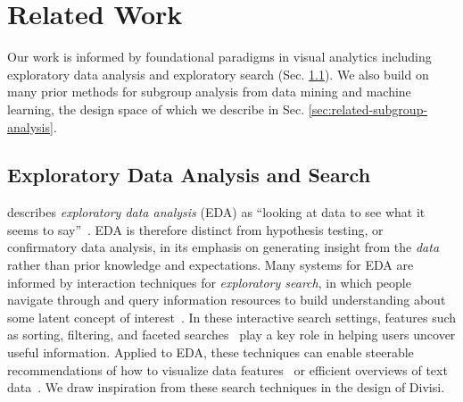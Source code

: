 \section{Related Work}

Our work is informed by foundational paradigms in visual analytics including exploratory data analysis and exploratory search (Sec. \ref{sec:related-eda}). 
We also build on many prior methods for subgroup analysis from data mining and machine learning, the design space of which we describe in Sec. \ref{sec:related-subgroup-analysis}.

\subsection{Exploratory Data Analysis and Search}
\label{sec:related-eda}

\citeauthor{tukey_exploratory_1970} describes \textit{exploratory data analysis} (EDA) as ``looking at data to see what it seems to say''~\cite{tukey_exploratory_1970}.
EDA is therefore distinct from hypothesis testing, or confirmatory data analysis, in its emphasis on generating insight from the \textit{data} rather than prior knowledge and expectations.
Many systems for EDA are informed by interaction techniques for \textit{exploratory search}, in which people navigate through and query information resources to build understanding about some latent concept of interest~\cite{white_exploratory_2009}.
In these interactive search settings, features such as sorting, filtering, and faceted searches~\cite{yee_2003_faceted} play a key role in helping users uncover useful information.
Applied to EDA, these techniques can enable steerable recommendations of how to visualize data features~\cite{wongsuphasawat_voyager_2016,lee_2021_lux} or efficient overviews of text data~\cite{felix_texttile_2017}.
We draw inspiration from these search techniques in the design of Divisi.

